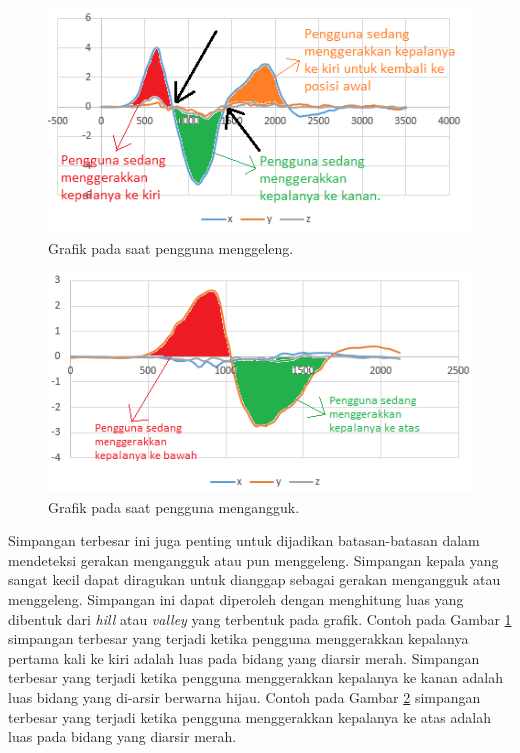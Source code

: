 \begin{figure}[htbp]
\centering
\includegraphics[scale=0.6]{Gambar/grafik-penjelasan-jarak-waktu-melawan-gerakan.png}
\caption{Grafik pada saat pengguna menggeleng.} 
\label{fig:grafik-penjelasan-jarak-waktu-melawan-gerakan}
\end{figure}

\begin{figure}[htbp]
\centering
\includegraphics[scale=0.6]{Gambar/grafik-penjelasan-jarak-waktu-melawan-gerakan-mengangguk.png}
\caption{Grafik pada saat pengguna mengangguk.} 
\label{fig:grafik-penjelasan-jarak-waktu-melawan-gerakan-mengangguk}
\end{figure}

Simpangan terbesar ini juga penting untuk dijadikan batasan-batasan dalam mendeteksi gerakan mengangguk atau pun menggeleng. Simpangan kepala yang sangat kecil dapat diragukan untuk dianggap sebagai gerakan mengangguk atau menggeleng. Simpangan ini dapat diperoleh dengan menghitung luas yang dibentuk dari \textit{hill} atau \textit{valley} yang terbentuk pada grafik. Contoh pada Gambar \ref{fig:grafik-penjelasan-jarak-waktu-melawan-gerakan} simpangan terbesar yang terjadi ketika pengguna menggerakkan kepalanya pertama kali ke kiri adalah luas pada bidang yang diarsir merah. Simpangan terbesar yang terjadi ketika pengguna menggerakkan kepalanya ke kanan adalah luas bidang yang di-arsir berwarna hijau. Contoh pada Gambar \ref{fig:grafik-penjelasan-jarak-waktu-melawan-gerakan-mengangguk} simpangan terbesar yang terjadi ketika pengguna menggerakkan kepalanya ke atas adalah luas pada bidang yang diarsir merah.

